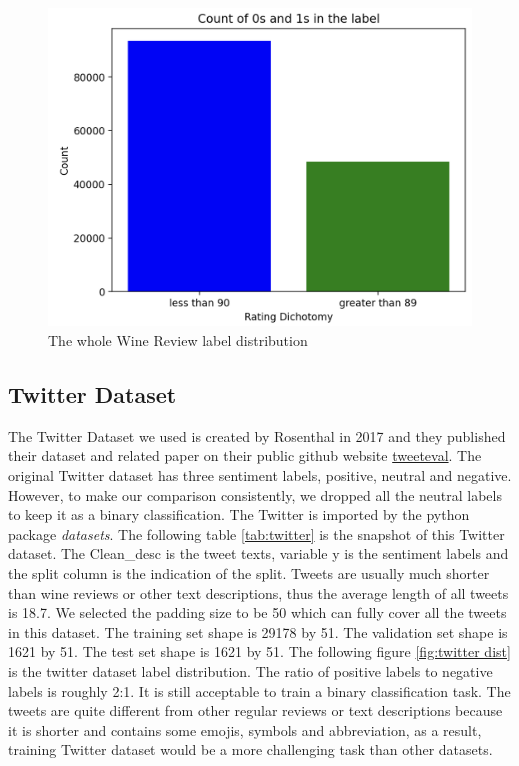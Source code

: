 \documentclass{article}
\begin{document}
\begin{figure}[!ht]
    \centering
    \includegraphics[width=0.5\linewidth]{wine label.png}
    \caption{The whole Wine Review label distribution}
    \label{fig:wine_label}
\end{figure}

\subsection{Twitter Dataset}
The Twitter Dataset we used is created by Rosenthal \cite{rosenthal2017semeval} in 2017 and they published their dataset and related paper on their public github website \hyperlink{https://github.com/cardiffnlp/tweeteval}{tweeteval}. The original Twitter dataset has three sentiment labels, positive, neutral and negative. However, to make our comparison consistently, we dropped all the neutral labels to keep it as a binary classification. The Twitter is imported by the python package \textit{datasets}. The following table \ref{tab:twitter} is the snapshot of this Twitter dataset. The Clean\_desc is the tweet texts, variable y is the sentiment labels and the split column is the indication of the split. Tweets are usually much shorter than wine reviews or other text descriptions, thus the average length of all tweets is 18.7. We selected the padding size to be 50 which can fully cover all the tweets in this dataset. The training set shape is 29178 by 51. The validation set shape is 1621 by 51. The test set shape is 1621 by 51. The following figure \ref{fig:twitter dist} is the twitter dataset label distribution. The ratio of positive labels to negative labels is roughly 2:1. It is still acceptable to train a binary classification task. The tweets are quite different from other regular reviews or text descriptions because it is shorter and contains some emojis, symbols and abbreviation, as a result, training Twitter dataset would be a more challenging task than other datasets. 
\end{document}

